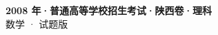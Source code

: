 \documentclass[zihao=-4, a4paper]{ctexart}
\begin{document}
\begin{center}
  {\Large\bfseries 2008 年·普通高等学校招生考试·陕西卷·理科}\\[4pt]
  {\large 数学 · 试题版}
\end{center}
\medskip
{}

\end{document}
